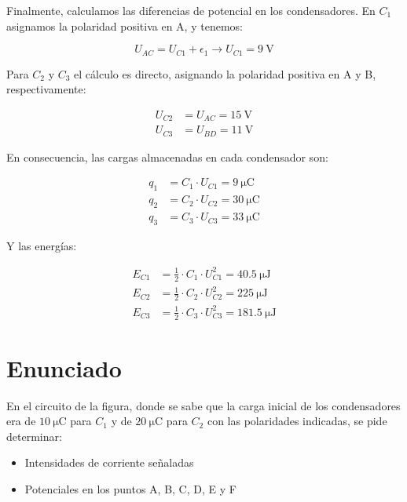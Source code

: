 Finalmente, calculamos las diferencias de potencial en los
condensadores. En $C_1$ asignamos la polaridad positiva en A, y
tenemos:

\begin{equation*}
  U_{AC} = U_{C1} + \epsilon_1 \rightarrow U_{C1} = \qty{9}{\volt}
\end{equation*}

Para $C_2$ y $C_3$ el cálculo es directo, asignando la polaridad positiva en A y B, respectivamente:

\begin{align*}
  U_{C2} &=  U_{AC} = \qty{15}{\volt}\\
  U_{C3} &=  U_{BD} = \qty{11}{\volt}
\end{align*}

En consecuencia, las cargas almacenadas en cada condensador son:

\begin{align*}
  q_1 &= C_1 \cdot U_{C1} = \qty{9}{\micro\coulomb}\\
  q_2 &= C_2 \cdot U_{C2} = \qty{30}{\micro\coulomb}\\
  q_3 &= C_3 \cdot U_{C3} = \qty{33}{\micro\coulomb}
\end{align*}

Y las energías:

\begin{align*}
  E_{C1} &= \frac{1}{2} \cdot C_1 \cdot U^2_{C1} = \qty{40.5}{\micro\joule}\\
  E_{C2} &= \frac{1}{2} \cdot C_2 \cdot U^2_{C2} = \qty{225}{\micro\joule}\\
  E_{C3} &= \frac{1}{2} \cdot C_3 \cdot U^2_{C3} = \qty{181.5}{\micro\joule}
\end{align*}


\section{Enunciado}

En el circuito de la figura, donde se sabe que la carga inicial de los
condensadores era de $\qty{10}{\micro\coulomb}$ para $C_1$ y de
$\qty{20}{\micro\coulomb}$ para $C_2$ con las polaridades indicadas,
se pide determinar:
\begin{itemize}
\item Intensidades de corriente señaladas
\item Potenciales en los puntos A, B, C, D, E y F
\end{itemize}


